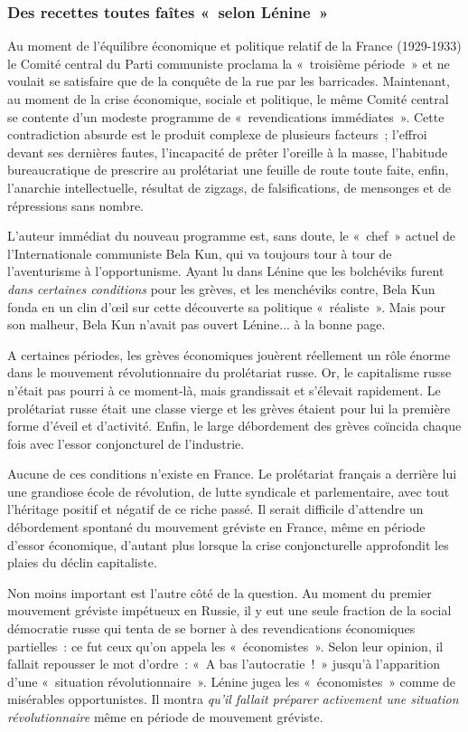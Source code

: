 \documentclass[french,twoside]{book} %
\begin{document}
\subsubsection[{Des recettes toutes faîtes « selon Lénine »}]{Des recettes toutes faîtes « selon Lénine »}
\noindent Au moment de l’équilibre économique et politique relatif de la France (1929-1933) le Comité central du Parti communiste proclama la « troisième période » et ne voulait se satisfaire que de la conquête de la rue par les barricades. Maintenant, au moment de la crise économique, sociale et politique, le même Comité central se contente d’un modeste programme de « revendications immédiates ». Cette contradiction absurde est le produit complexe de plusieurs facteurs ; l’effroi devant ses dernières fautes, l’incapacité de prêter l’oreille à la masse, l’habitude bureaucratique de prescrire au prolétariat une feuille de route toute faite, enfin, l’anarchie intellectuelle, résultat de zigzags, de falsifications, de mensonges et de répressions sans nombre.\par
L’auteur immédiat du nouveau programme est, sans doute, le « chef » actuel de l’Internationale communiste Bela Kun, qui va toujours tour à tour de l’aventurisme à l’opportunisme. Ayant lu dans Lénine que les bolchéviks furent \emph{dans certaines conditions} pour les grèves, et les menchéviks contre, Bela Kun fonda en un clin d’œil sur cette découverte sa politique « réaliste ». Mais pour son malheur, Bela Kun n’avait pas ouvert Lénine... à la bonne page.\par
A certaines périodes, les grèves économiques jouèrent réellement un rôle énorme dans le mouvement révolutionnaire du prolétariat russe. Or, le capitalisme russe n’était pas pourri à ce moment-là, mais grandissait et s’élevait rapidement. Le prolétariat russe était une classe vierge et  les grèves étaient pour lui la première forme d’éveil et d’activité. Enfin, le large débordement des grèves coïncida chaque fois avec l’essor conjoncturel de l’industrie.\par
Aucune de ces conditions n’existe en France. Le prolétariat français a derrière lui une grandiose école de révolution, de lutte syndicale et parlementaire, avec tout l’héritage positif et négatif de ce riche passé. Il serait difficile d’attendre un débordement spontané du mouvement gréviste en France, même en période d’essor économique, d’autant plus lorsque la crise conjoncturelle approfondit les plaies du déclin capitaliste.\par
Non moins important est l’autre côté de la question. Au moment du premier mouvement gréviste impétueux en Russie, il y eut une seule fraction de la social démocratie russe qui tenta de se borner à des revendications économiques partielles : ce fut ceux qu’on appela les « économistes ». Selon leur opinion, il fallait repousser le mot d’ordre : « A bas l’autocratie ! » jusqu’à l’apparition d’une « situation révolutionnaire ». Lénine jugea les « économistes » comme de misérables opportunistes. Il montra \emph{qu’il fallait préparer activement une situation révolutionnaire} même en période de mouvement gréviste.\par
\end{document}
